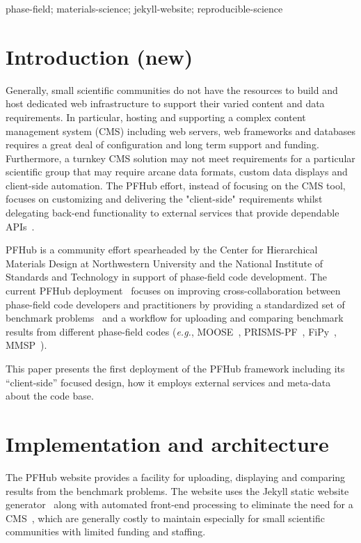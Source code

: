 \documentclass{jors}
\begin{document}
phase-field; materials-science; jekyll-website; reproducible-science

\section*{Introduction (new)}

Generally, small scientific communities do not have the resources to
build and host dedicated web infrastructure to support their varied
content and data requirements. In particular, hosting and supporting a
complex content management system (CMS) including web servers, web
frameworks and databases requires a great deal of configuration and
long term support and funding. Furthermore, a turnkey CMS solution may
not meet requirements for a particular scientific group that may
require arcane data formats, custom data displays and client-side
automation. The PFHub effort, instead of focusing on the CMS tool,
focuses on customizing and delivering the "client-side" requirements
whilst delegating back-end functionality to external services that
provide dependable APIs~\cite{cmsfree}.

PFHub is a community effort spearheaded by the Center for Hierarchical
Materials Design at Northwestern University and the National Institute
of Standards and Technology in support of phase-field code
development. The current PFHub deployment~\cite{pfhub} focuses on
improving cross-collaboration between phase-field code developers and
practitioners by providing a standardized set of benchmark
problems~\cite{bm1, bm2} and a workflow for uploading and comparing
benchmark results from different phase-field codes (\emph{e.g.},
MOOSE~\cite{moose}, PRISMS-PF~\cite{prisms-pf}, FiPy~\cite{fipy},
MMSP~\cite{mmsp}).

This paper presents the first deployment of the PFHub framework
including its ``client-side'' focused design, how it employs external
services and meta-data about the code base.

\section*{Implementation and architecture}

The PFHub website provides a facility for uploading, displaying and
comparing results from the benchmark problems. The website uses the
Jekyll static website generator~\cite{jekyll} along with automated
front-end processing to eliminate the need for a CMS~\cite{cmsfree},
which are generally costly to maintain especially for small scientific
communities with limited funding and staffing.
\end{document}
